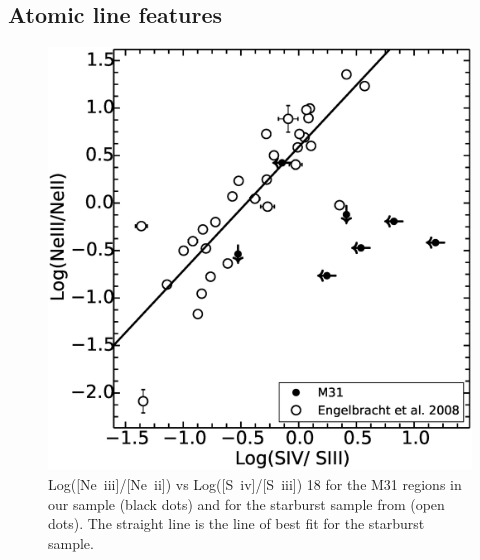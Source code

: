 \subsection{Atomic line features}
\label{sect:atomic}

\begin{figure}
\centering
\includegraphics[scale=0.3]{./NevsS.eps}
\caption{ Log([Ne~{\sc iii}]/[Ne~{\sc ii}])  vs Log([S~{\sc iv}]/[S~{\sc iii}]) 18 for the M31 regions in our sample (black dots) and for the starburst sample from \citet{Engelbracht_2008} (open dots). The straight line is the line of best fit for the starburst sample.}
\label{SvsNe}
\end{figure}

